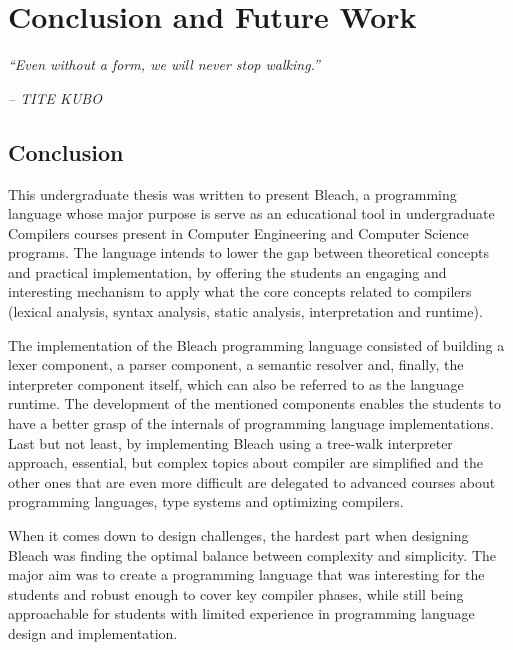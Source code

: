 \chapter{Conclusion and Future Work} \label{cap:conclusao}

\begin{displayquote}
    \begin{center}
        \textit{``Even without a form, we will never stop walking.''}
    \end{center}
\end{displayquote}

\begin{flushright}
   \textit{-- TITE KUBO}
\end{flushright}

\section{Conclusion}
This undergraduate thesis was written to present Bleach, a programming language whose major purpose is serve as an educational tool in undergraduate Compilers courses present in Computer Engineering and Computer Science programs. The language intends to lower the gap between theoretical concepts and practical implementation, by offering the students an engaging and interesting mechanism to apply what the core concepts related to compilers (lexical analysis, syntax analysis, static analysis, interpretation and runtime).

The implementation of the Bleach programming language consisted of building a lexer component, a parser component, a semantic resolver and, finally, the interpreter component itself, which can also be referred to as the language runtime. The development of the mentioned components enables the students to have a better grasp of the internals of programming language implementations. Last but not least, by implementing Bleach using a tree-walk interpreter approach, essential, but complex topics about compiler are simplified and the other ones that are even more difficult are delegated to advanced courses about programming languages, type systems and optimizing compilers.

When it comes down to design challenges, the hardest part when designing Bleach was finding the optimal balance between complexity and simplicity. The major aim was to create a programming language that was interesting for the students and robust enough to cover key compiler phases, while still being approachable for students with limited experience in programming language design and implementation.


